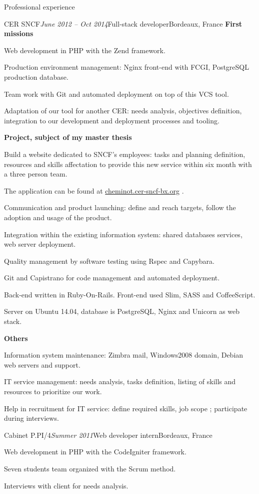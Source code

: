 \begin{rSection}{Professional experience}
\begin{rSubsection}{CER SNCF}{\em June 2012 -- Oct 2014}{Full-stack developer}{Bordeaux, France}
    \textbf{First missions}
      \item Web development in PHP with the Zend framework.
      \item Production environment management: Nginx front-end with FCGI, PostgreSQL production database.
      \item Team work with Git and automated deployment on top of this VCS tool.
      \item Adaptation of our tool for another CER: needs analysis, objectives definition, integration to our development and deployment processes and tooling.

    \textbf{Project, subject of my master thesis}
      \item Build a website dedicated to SNCF's employees: tasks and planning definition, resources and skills affectation to provide this new service within six month with a three person team.
      \item The application can be found at \href{http://cheminot.cer-sncf-bx.org}{cheminot.cer-sncf-bx.org} .
      \item Communication and product launching: define and reach targets, follow the adoption and usage of the product.
      \item Integration within the existing information system: shared databases services, web server deployment.
      \item Quality management by software testing using Rspec and Capybara.
      \item Git and Capistrano for code management and automated deployment.
      \item Back-end written in Ruby-On-Rails. Front-end used Slim, SASS and CoffeeScript.
      \item Server on Ubuntu 14.04, database is PostgreSQL, Nginx and Unicorn as web stack.

    \textbf{Others}
      \item Information system maintenance: Zimbra mail, Windows2008 domain, Debian web servers and support.
      \item IT service management: needs analysis, tasks definition, listing of skills and resources to prioritize our work.
      \item Help in recruitment for IT service: define required skills, job scope ; participate during interviews.

  \end{rSubsection}


  \begin{rSubsection}{Cabinet P.PI/4}{\em Summer 2011}{Web developer intern}{Bordeaux, France}
    \item Web development in PHP with the CodeIgniter framework.
    \item Seven students team organized with the Scrum method.
    \item Interviews with client for needs analysis.
  \end{rSubsection}

\end{rSection}
